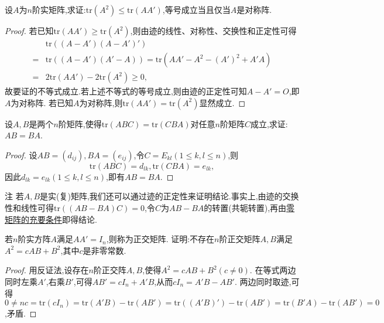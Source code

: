 \documentclass[../../main.tex]{subfiles}
\begin{document}
\begin{proposition}\label{proposition:矩阵迹的不等式}
设\(A\)为\(n\)阶实矩阵,求证:\(\mathrm{tr}(A^2)\leqslant \mathrm{tr}(AA')\),等号成立当且仅当\(A\)是对称阵.
\end{proposition}
\begin{proof}
若已知$\mathrm{tr}(AA') \geqslant  \mathrm{tr}(A^2)$,则由迹的线性、对称性、交换性和正定性可得
\begin{align*}
&\mathrm{tr}((A - A')(A - A')')\\
=&\mathrm{tr}((A - A')(A' - A))=\mathrm{tr}(AA' - A^2 - (A')^2 + A'A)\\
=&2\mathrm{tr}(AA') - 2\mathrm{tr}(A^2)\geqslant 0,
\end{align*}
故要证的不等式成立.若上述不等式的等号成立,则由迹的正定性可知\(A - A' = O\),即\(A\)为对称阵.
若已知$A$为对称阵,则$\mathrm{tr}(AA') = \mathrm{tr}(A^2)$显然成立.
\end{proof}

\begin{proposition}\label{proposition:矩阵可交换关于迹的充分条件}
设\(A,B\)是两个\(n\)阶矩阵,使得\(\mathrm{tr}(ABC)=\mathrm{tr}(CBA)\)对任意\(n\)阶矩阵\(C\)成立,求证:\(AB = BA\).
\end{proposition}
\begin{proof}
设\(AB=(d_{ij}),BA=(e_{ij})\),令\(C = E_{kl}(1\leqslant  k,l\leqslant  n)\),则
\[
\mathrm{tr}(ABC)=d_{lk},\mathrm{tr}(CBA)=e_{lk},
\]
因此\(d_{lk}=e_{lk}(1\leqslant  k,l\leqslant  n)\),即有\(AB = BA\).
\end{proof}
\begin{remark}
注 若\(A,B\)是实(复)矩阵,我们还可以通过迹的正定性来证明结论.事实上,由迹的交换性和线性可得\(\mathrm{tr}((AB - BA)C)=0\),令\(C\)为\(AB - BA\)的转置(共轭转置),再由\hyperref[proposition:零矩阵的充要条件]{零矩阵的充要条件}即得结论.
\end{remark}

\begin{example}
若\(n\)阶实方阵\(A\)满足\(AA' = I_n\),则称为正交矩阵. 证明:不存在\(n\)阶正交矩阵\(A,B\)满足\(A^2 = cAB + B^2\),其中\(c\)是非零常数.
\end{example}
\begin{proof}
用反证法,设存在\(n\)阶正交阵\(A,B\),使得\(A^2 = cAB + B^2(c\neq0)\). 在等式两边同时左乘\(A'\),右乘\(B'\),可得\(AB' = cI_n + A'B\),从而\(cI_n = A'B - AB'\). 两边同时取迹,可得\(0\ne nc=\text{tr}(cI_n)=\text{tr}(A'B)-\text{tr}(AB')=\text{tr}((A'B)') - \text{tr}(AB')=\text{tr}(B'A)-\text{tr}(AB') = 0\),矛盾.
\end{proof}
\end{document}
